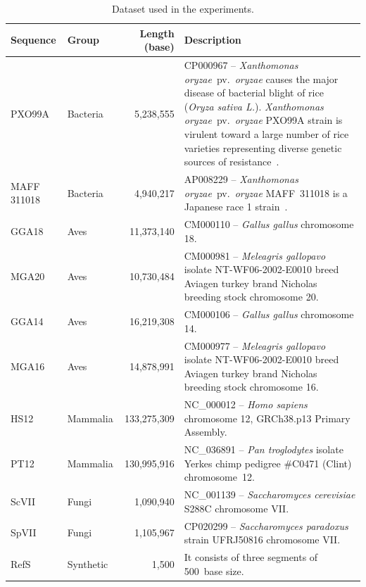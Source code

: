 \documentclass[a4paper,num-refs]{oup-contemporary}
\begin{document}
\begin{table}[h]
  \caption{Dataset used in the experiments.}
  \label{tab.dataset.real}
  \begin{tabularx}{\linewidth}{llrX}
    \toprule
    Sequence & Group & Length (base) & Description \\
    \midrule
    PXO99A & Bacteria & 5,238,555 & CP000967 -- \textit{Xanthomonas oryzae}~pv.~\textit{oryzae} causes the major disease of bacterial blight of rice (\textit{Oryza sativa L.}). 
    \textit{Xanthomonas oryzae}~pv.~\textit{oryzae} PXO99A strain is virulent toward a large number of rice varieties representing diverse genetic sources of resistance~\cite{salzberg2008genome}. \\
    MAFF 311018 & Bacteria & 4,940,217 & AP008229 -- \textit{Xanthomonas oryzae}~pv.~\textit{oryzae} MAFF~311018 is a Japanese race 1 strain~\cite{ochiai2005genome}. \\
    \midrule
    GGA18 & Aves & 11,373,140 & CM000110 -- \textit{Gallus gallus} chromosome 18. \\
    MGA20 & Aves & 10,730,484 & CM000981 -- \textit{Meleagris gallopavo} isolate NT-WF06-2002-E0010 breed Aviagen turkey brand Nicholas breeding stock chromosome 20. \\
    \midrule
    GGA14 & Aves & 16,219,308 & CM000106 -- \textit{Gallus gallus} chromosome 14. \\
    MGA16 & Aves & 14,878,991 & CM000977 -- \textit{Meleagris gallopavo} isolate NT-WF06-2002-E0010 breed Aviagen turkey brand Nicholas breeding stock chromosome 16. \\
    \midrule
    HS12 & Mammalia & 133,275,309 & NC\_000012 -- \textit{Homo sapiens} chromosome 12, GRCh38.p13 Primary Assembly. \\
    PT12 & Mammalia & 130,995,916 & NC\_036891 -- \textit{Pan troglodytes} isolate Yerkes chimp pedigree \#C0471 (Clint) chromosome~12. \\
    \midrule
    ScVII & Fungi & 1,090,940 & NC\_001139 -- \textit{Saccharomyces cerevisiae} S288C chromosome VII. \\
    SpVII & Fungi & 1,105,967 & CP020299 -- \textit{Saccharomyces paradoxus} strain UFRJ50816 chromosome VII. \\
    \midrule
    RefS & Synthetic & 1,500 & It consists of three segments of 500~base size. \\

\end{tabularx}
\end{table}
\end{document}
